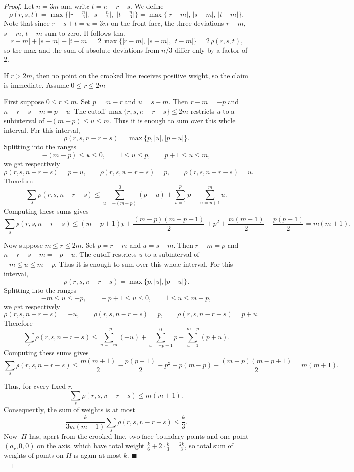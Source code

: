 \documentclass[usenames,dvipsnames, 11pt]{article}
\numberwithin{thm}{section}
\theoremstyle{definition}
\theoremstyle{definition}
\theoremstyle{definition}
\newcommand{\1}{\mathbf{1}}
\begin{document}
\begin{proof}
Let $n=3m$ and write $t=n-r-s$. We define
$$\rho(r,s,t)=\max\!\Big\{\Big|r-\tfrac{n}{3}\Big|,\;\Big|s-\tfrac{n}{3}\Big|,\;\Big|t-\tfrac{n}{3}\Big|\Big\} = \max\{|r-m|,\,|s-m|,\,|t-m|\}.$$
Note that since $r+s+t=n=3m$ on the front face, the three deviations $r-m$, $s-m$, $t-m$ sum to zero. It follows that
$$|r-m|+|s-m|+|t-m|=2\,\max\{|r-m|,\,|s-m|,\,|t-m|\}=2\,\rho(r,s,t),$$
so the max and the sum of absolute deviations from $n/3$ differ only by a factor of $2$.

If $r>2m$, then no point on the crooked
line receives positive weight, so the claim is immediate. Assume
$0\leq r\leq 2m$.

First suppose $0\leq r\leq m$. Set
$p=m-r$ and $u=s-m$. Then
$r-m=-p$ and $ n-r-s-m=p-u$.
The cutoff $\max\{r,s,n-r-s\}\leq 2m$ restricts $u$ to a subinterval of
$-(m-p)\leq u\leq m$.
Thus it is enough to sum over this whole interval. For this interval,
$$\rho(r,s,n-r-s)=\max\{p,|u|,|p-u|\}.$$
Splitting into the ranges
$$-(m-p)\leq u\leq 0,\qquad 1\leq u\leq p,\qquad p+1\leq u\leq m,$$
we get respectively
$$\rho(r,s,n-r-s)=p-u,\qquad \rho(r,s,n-r-s)=p,\qquad \rho(r,s,n-r-s)=u.$$
Therefore
$$\sum_s \rho(r,s,n-r-s) \leq \sum_{u=-(m-p)}^{0}(p-u) + \sum_{u=1}^{p}p + \sum_{u=p+1}^{m}u.$$
Computing these sums gives
$$\sum_s \rho(r,s,n-r-s) \leq (m-p+1)p+\frac{(m-p)(m-p+1)}2 +p^2 +\frac{m(m+1)}2-\frac{p(p+1)}2 = m(m+1).$$

Now suppose $m\leq r\leq 2m$. Set $p=r-m$ and $u=s-m$.
Then $r-m=p$ and  $n-r-s-m=-p-u$. The cutoff restricts $u$ to a subinterval of
$-m\leq u\leq m-p$. Thus it is enough to sum over this whole interval. For this interval,
$$\rho(r,s,n-r-s)=\max\{p,|u|,|p+u|\}.$$
Splitting into the ranges
$$-m\leq u\leq -p,\qquad -p+1\leq u\leq 0,\qquad 1\leq u\leq m-p,$$
we get respectively
$$\rho(r,s,n-r-s)=-u,\qquad \rho(r,s,n-r-s)=p,\qquad \rho(r,s,n-r-s)=p+u.$$
Therefore
$$\sum_s \rho(r,s,n-r-s) \leq \sum_{u=-m}^{-p}(-u) + \sum_{u=-p+1}^{0}p + \sum_{u=1}^{m-p}(p+u).$$
Computing these sums gives
$$\sum_s \rho(r,s,n-r-s) \leq \frac{m(m+1)}2-\frac{p(p-1)}2 +p^2 +p(m-p)+\frac{(m-p)(m-p+1)}2 = m(m+1).$$

Thus, for every fixed $r$,
$$\sum_s \rho(r,s,n-r-s)\leq m(m+1).$$
Consequently, the sum of weights is at most
$$\frac{k}{3m(m+1)} \sum_s \rho(r,s,n-r-s) \leq \frac{k}{3}.$$
Now, $H$ has, apart from the crooked line, two face boundary points and one point $(a_r,0,0)$ on the axis, which have total weight $\frac{k}{6}+2 \cdot\frac{k}{3}=\frac{2k}{3}$, so total sum of weights of points on $H$ is again at most $k$. $\blacksquare$
\\ 
    

\end{proof}
\end{document}
